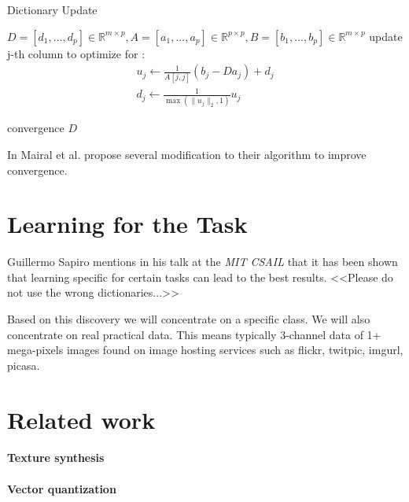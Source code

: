 \begin{algorithm}
\caption{Dictionary Update}
\label{alg:update}
\begin{algorithmic}[1]
\REQUIRE $D=[d_1,...,d_p] \in \mathbb{R}^{m \times p}, A=[a_1,...,a_p] \in \mathbb{R}^{p \times p}, B=[b_1,...,b_p] \in \mathbb{R}^{m \times p}$
\REPEAT
{}
\STATE update j-th column to optimize for :
\begin{align*}
u_j \gets \frac{1}{A[j,j]}\left(b_j-Da_j\right)+d_j \\
d_j \gets \frac{1}{\max\left(\lVert u_j \rVert_2,1\right)} u_j
\end{align*}

\ENDFOR
\UNTIL convergence 
\RETURN $D$
\end{algorithmic}
\end{algorithm}

In \cite{Mairal2010} Mairal et al. propose several modification to their
algorithm to improve convergence.



\section{Learning for the Task}
\label{sec:learnForTheTask}
Guillermo Sapiro mentions in his talk\cite{sapiroSlides} at the \emph{MIT CSAIL}
that it has been shown that learning specific for certain tasks can lead to the
best results. <<Please do not use the wrong dictionaries...>>

Based on this discovery we will concentrate on a specific class. 
We will also concentrate on real practical data. This means typically 3-channel
data of 1+ mega-pixels images found on image hosting services such as flickr,
twitpic, imgurl, picasa.


\section{Related work}

\paragraph{Texture synthesis}\cite{Peyre2008}

\paragraph{Vector quantization}

